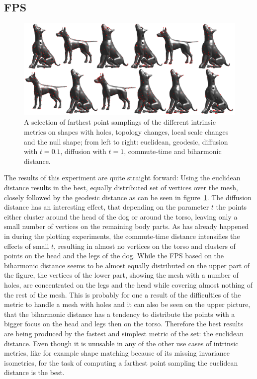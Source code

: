 \subsection{FPS}
\begin{figure}[h]
	\centering
	\includegraphics[width = \textwidth]{../results/fps_end}
	\caption{A selection of farthest point samplings of the different intrinsic metrics on shapes with holes, topology changes, local scale changes and the null shape; from left to right: euclidean, geodesic, diffusion with $t=0.1$, diffusion with $t=1$, commute-time and biharmonic distance.}
	\label{fig:fps_end}
\end{figure}
The results of this experiment are quite straight forward:
Using the euclidean distance results in the best, equally distributed set of vertices over the mesh, closely followed by the geodesic distance as can be seen in figure~\ref{fig:fps_end}.
The diffusion distance has an interesting effect, that depending on the parameter $t$ the points either cluster around the head of the dog or around the torso, leaving only a small number of vertices on the remaining body parts.
As has already happened in during the plotting experiments, the commute-time distance intensifies the effects of small $t$, resulting in almost no vertices on the torso and clusters of points on the head and the legs of the dog.
While the FPS based on the biharmonic distance seems to be almost equally distributed on the upper part of the figure, the vertices of the lower part, showing the mesh with a number of holes, are concentrated on the legs and the head while covering almost nothing of the rest of the mesh.
This is probably for one a result of the difficulties of the metric to handle a mesh with holes and it can also be seen on the upper picture, that the biharmonic distance has a tendency to distribute the points with a bigger focus on the head and legs then on the torso.
Therefore the best results are being produced by the fastest and simplest metric of the set: the euclidean distance.
Even though it is unusable in any of the other use cases of intrinsic metrics, like for example shape matching because of its missing invariance isometries, for the task of computing a farthest point sampling the euclidean distance is the best.



